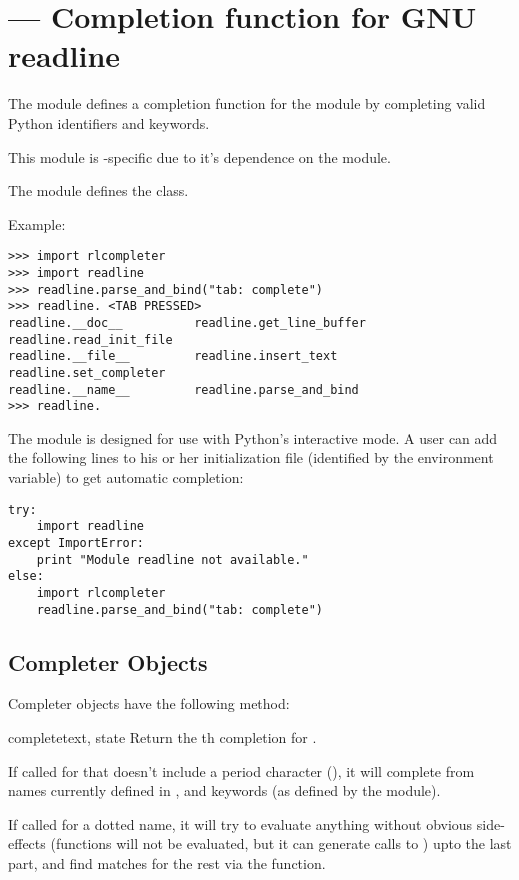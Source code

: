 \section{ ---
         Completion function for GNU readline}


The  module defines a completion function for
the  module by completing valid Python identifiers
and keywords.

This module is \UNIX-specific due to it's dependence on the
 module.

The  module defines the  class.

Example:

\begin{verbatim}
>>> import rlcompleter
>>> import readline
>>> readline.parse_and_bind("tab: complete")
>>> readline. <TAB PRESSED>
readline.__doc__          readline.get_line_buffer  readline.read_init_file
readline.__file__         readline.insert_text      readline.set_completer
readline.__name__         readline.parse_and_bind
>>> readline.
\end{verbatim}

The  module is designed for use with Python's
interactive mode.  A user can add the following lines to his or her
initialization file (identified by the 
environment variable) to get automatic  completion:

\begin{verbatim}
try:
    import readline
except ImportError:
    print "Module readline not available."
else:
    import rlcompleter
    readline.parse_and_bind("tab: complete")
\end{verbatim}


\subsection{Completer Objects \label{completer-objects}}

Completer objects have the following method:

\begin{methoddesc}[Completer]{complete}{text, state}
Return the th completion for .

If called for  that doesn't include a period character
(), it will complete from names currently defined in
,  and
keywords (as defined by the  module).

If called for a dotted name, it will try to evaluate anything without
obvious side-effects (functions will not be evaluated, but it
can generate calls to ) upto the last part, and
find matches for the rest via the  function.
\end{methoddesc}
